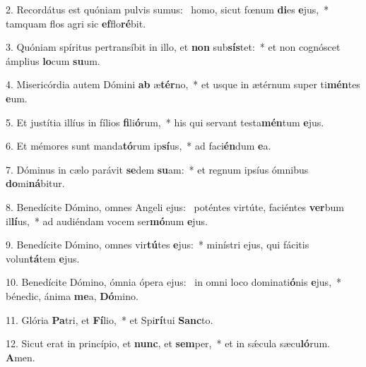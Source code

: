 2. Recordátus est quóniam pulvis sumus: \dag\  homo, sicut fœnum \textbf{di}es \textbf{e}jus,~*  tamquam flos agri sic \textbf{ef}flo\textbf{ré}bit.\

3. Quóniam spíritus pertransíbit in illo, et \textbf{non} sub\textbf{sís}tet:~*  et non cognóscet ámplius \textbf{lo}cum \textbf{su}um.\

4. Misericórdia autem Dómini \textbf{ab} æ\textbf{tér}no,~*  et usque in ætérnum super ti\textbf{mén}tes \textbf{e}um.\

5. Et justítia illíus in fílios \textbf{fi}li\textbf{ó}rum,~*  his qui servant testa\textbf{mén}tum \textbf{e}jus.\

6. Et mémores sunt manda\textbf{tó}rum ip\textbf{sí}us,~*  ad faci\textbf{én}dum \textbf{e}a.\

7. Dóminus in cælo parávit \textbf{se}dem \textbf{su}am:~*  et regnum ipsíus ómnibus \textbf{do}mi\textbf{ná}bitur.\

8. Benedícite Dómino, omnes Angeli ejus: \dag\  poténtes virtúte, faciéntes \textbf{ver}bum il\textbf{lí}us,~*  ad audiéndam vocem ser\textbf{mó}num \textbf{e}jus.\

9. Benedícite Dómino, omnes vir\textbf{tú}tes \textbf{e}jus:~*  minístri ejus, qui fácitis volun\textbf{tá}tem \textbf{e}jus.\

10. Benedícite Dómino, ómnia ópera ejus: \dag\  in omni loco dominati\textbf{ó}nis \textbf{e}jus,~*  bénedic, ánima \textbf{me}a, \textbf{Dó}mino.\

11. Glória \textbf{Pa}tri, et \textbf{Fí}lio,~*  et Spi\textbf{rí}tui \textbf{Sanc}to.\

12. Sicut erat in princípio, et \textbf{nunc}, et \textbf{sem}per,~*  et in sǽcula sæcu\textbf{ló}rum. \textbf{A}men.\

